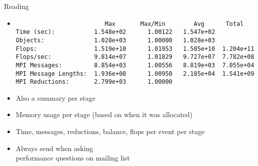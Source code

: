 \begin{frame}[fragile]{Reading }
\begin{itemize}
\item
{\scriptsize
\begin{verbatim}
                         Max       Max/Min        Avg      Total 
Time (sec):           1.548e+02      1.00122   1.547e+02
Objects:              1.028e+03      1.00000   1.028e+03
Flops:                1.519e+10      1.01953   1.505e+10  1.204e+11
Flops/sec:            9.814e+07      1.01829   9.727e+07  7.782e+08
MPI Messages:         8.854e+03      1.00556   8.819e+03  7.055e+04
MPI Message Lengths:  1.936e+08      1.00950   2.185e+04  1.541e+09
MPI Reductions:       2.799e+03      1.00000
\end{verbatim}}
\item Also a summary per stage
\item Memory usage per stage (based on when it was allocated)
\item Time, messages, reductions, balance, flops per event per stage
\item Always send  when asking \\
  performance questions on mailing list
\end{itemize}
\end{frame}
